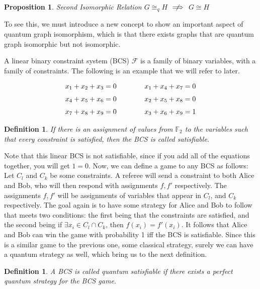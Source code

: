 \documentclass[12pt]{article}
\newtheorem{proposition}[thm]{Proposition}
\newtheorem{defn}[thm]{Definition}
\begin{document}
\begin{proposition}{Second Isomorphic Relation}
$G \cong_q H$ $\centernot\implies$ $G \cong H$
\end{proposition}
To see this, we must introduce a new concept to show an important aspect of quantum graph isomorphism, which is that there exists graphs that are quantum graph isomorphic but not isomorphic.

A linear binary constraint system (BCS) $\mathcal{F}$ is a family of binary variables, with a family of constraints. The following is an example that we will refer to later.

\begin{equation*}
\label{bcs}
\openup\jot %
\begin{aligned}[t]
x_1 + x_2 + x_3 &= 0 \\
x_4 + x_5 + x_6 &= 0 \\
x_7 + x_8 + x_9 &= 0
\end{aligned}
\qquad\qquad %
\begin{aligned}[t]
x_1 + x_4 + x_7 &= 0 \\
x_2 + x_5 + x_8 &= 0 \\
x_3 + x_6 + x_9 &= 1
\end{aligned}
\end{equation*}

\begin{defn}
If there is an assignment of values from $\mathbb{F}_2$ to the variables such that every constraint is satisfied, then the BCS is called satisfiable.
\end{defn}
Note that this linear BCS is not satisfiable, since if you add all of the equations together, you will get $1=0$. Now, we can define a game to any BCS as follows: Let $C_l$ and $C_k$ be some constraints. A referee will send a constraint to both Alice and Bob, who will then respond with assignments $f, f'$ respectively. The assignments $f, f'$ will be assignments of variables that appear in $C_l$, and $C_k$ respectively. The goal again is to have some strategy for Alice and Bob to follow that meets two conditions: the first being that the constraints are satisfied, and the second being if $\exists x_i \in C_l \cap C_k$, then $f(x_i) = f'(x_i)$. It follows that Alice and Bob can win the game with probability 1 iff the BCS is satisfiable. Since this is a similar game to the previous one, some classical strategy, surely we can have a quantum strategy as well, which bring us to the next definition.
\begin{defn}
A BCS is called quantum satisfiable if there exists a perfect quantum strategy for the BCS game.
\end{defn}
\end{document}

